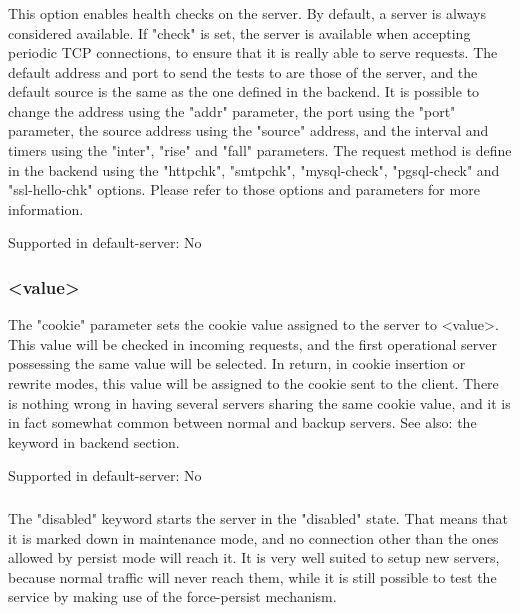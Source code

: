 \subsubsection[check]{}
  This option enables health checks on the server. By default, a server is
  always considered available. If "check" is set, the server is available when
  accepting periodic TCP connections, to ensure that it is really able to serve
  requests. The default address and port to send the tests to are those of the
  server, and the default source is the same as the one defined in the
  backend. It is possible to change the address using the "addr" parameter, the
  port using the "port" parameter, the source address using the "source"
  address, and the interval and timers using the "inter", "rise" and "fall"
  parameters. The request method is define in the backend using the "httpchk",
  "smtpchk", "mysql-check", "pgsql-check" and "ssl-hello-chk" options. Please
  refer to those options and parameters for more information.

  Supported in default-server: No

\subsubsection[cookie]{ <value>}
  The "cookie" parameter sets the cookie value assigned to the server to
  <value>. This value will be checked in incoming requests, and the first
  operational server possessing the same value will be selected. In return, in
  cookie insertion or rewrite modes, this value will be assigned to the cookie
  sent to the client. There is nothing wrong in having several servers sharing
  the same cookie value, and it is in fact somewhat common between normal and
  backup servers.
See also: the  keyword in backend section.

  Supported in default-server: No

\subsubsection[disabled]{}
  The "disabled" keyword starts the server in the "disabled" state. That means
  that it is marked down in maintenance mode, and no connection other than the
  ones allowed by persist mode will reach it. It is very well suited to setup
  new servers, because normal traffic will never reach them, while it is still
  possible to test the service by making use of the force-persist mechanism.

